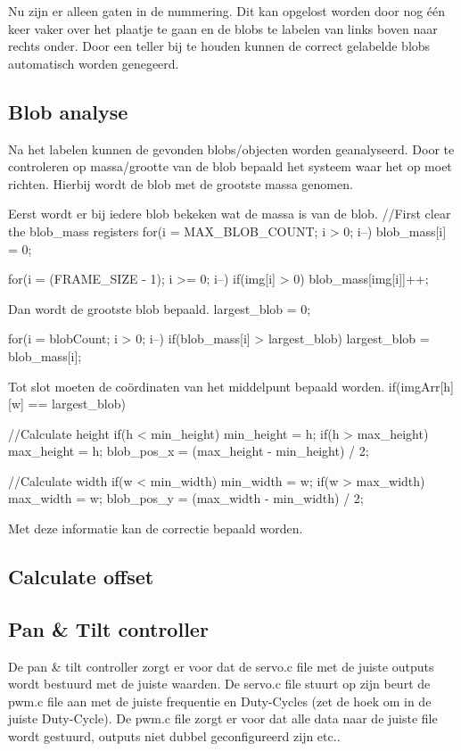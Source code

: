 Nu zijn er alleen gaten in de nummering. Dit kan opgelost worden door nog 
één keer vaker over het plaatje te gaan en de blobs te labelen van links 
boven naar rechts onder. Door een teller bij te houden kunnen de correct 
gelabelde blobs automatisch worden genegeerd.

\subsection{Blob analyse}
\label{sub:blobanalyse}
Na het labelen kunnen de gevonden blobs/objecten worden geanalyseerd. Door 
te controleren op massa/grootte van de blob bepaald het systeem waar het op 
moet richten. Hierbij wordt de blob met de grootste massa genomen.

Eerst wordt er bij iedere blob bekeken wat de massa is van de blob.
//First clear the blob_mass registers
for(i = MAX_BLOB_COUNT; i > 0; i--){
    blob_mass[i] = 0;
}

for(i = (FRAME_SIZE - 1); i >= 0; i--){
    if(img[i] > 0){
        blob_mass[img[i]]++;
    }
}

Dan wordt de grootste blob bepaald.
largest_blob = 0;

for(i = blobCount; i > 0; i--){
    if(blob_mass[i] > largest_blob){
        largest_blob = blob_mass[i];
    }
}

Tot slot moeten de coördinaten van het middelpunt bepaald worden.
if(imgArr[h][w] == largest_blob){
    //Calculate height
    if(h < min_height){
        min_height = h;
    }
    if(h > max_height){
        max_height = h;
    }
    blob_pos_x = (max_height - min_height) / 2;

    //Calculate width
    if(w < min_width){
        min_width = w;
    }
    if(w > max_width){
        max_width = w;
    }
    blob_pos_y = (max_width - min_width) / 2;
}

Met deze informatie kan de correctie bepaald worden.

\subsection{Calculate offset}
\label{sub:calcoffset}


\subsection{Pan & Tilt controller}
\label{sub:panTiltContr}
De pan & tilt controller zorgt er voor dat de servo.c file met de juiste outputs 
wordt bestuurd met de juiste waarden. De servo.c file stuurt op zijn beurt de pwm.c 
file aan met de juiste frequentie en Duty-Cycles (zet de hoek om in de juiste 
Duty-Cycle). De pwm.c file zorgt er voor dat alle data naar de juiste file wordt 
gestuurd, outputs niet dubbel geconfigureerd zijn etc..

